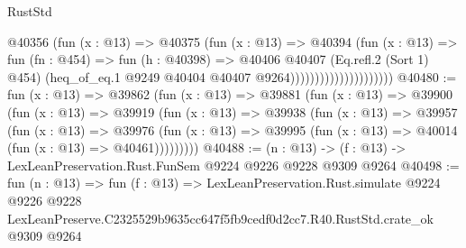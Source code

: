 \begin{lexlean}{RustStd}
\begin{coremodule}
                                    @40356
                                      (fun (x : @13) =>
                                      @40375
                                        (fun (x : @13) =>
                                        @40394
                                          (fun (x : @13) =>
                                          fun (fn : @454) =>
                                          fun (h : @40398) =>
                                          @40406
                                            @40407
                                            (Eq.refl.{2} (Sort 1) @454)
                                            (heq_of_eq.{1}
                                              @9249
                                              @40404
                                              @40407
                                              @9264)))))))))))))))))))))
@40480 := fun (x : @13) =>
  @39862
    (fun (x : @13) =>
    @39881
      (fun (x : @13) =>
      @39900
        (fun (x : @13) =>
        @39919
          (fun (x : @13) =>
          @39938
            (fun (x : @13) =>
            @39957
              (fun (x : @13) =>
              @39976
                (fun (x : @13) => @39995 (fun (x : @13) => @40014 (fun (x : @13) => @40461)))))))))
@40488 := (n : @13) -> (f : @13) -> LexLeanPreservation.Rust.FunSem @9224 @9226 @9228 @9309 @9264
@40498 := fun (n : @13) =>
  fun (f : @13) =>
  LexLeanPreservation.Rust.simulate
    @9224
    @9226
    @9228
    LexLeanPreserve.C2325529b9635cc647f5fb9cedf0d2cc7.R40.RustStd.crate_ok
    @9309
    @9264
\end{coremodule}
\end{lexlean}
